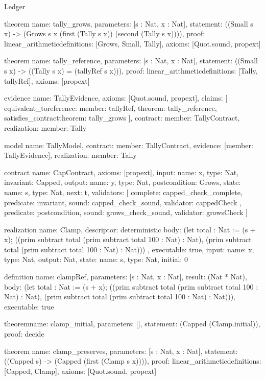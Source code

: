 \begin{lexlean}{Ledger}
\begin{semanticmodule}
theorem{
  name: tally_grows,
  parameters: [s : Nat, x : Nat],
  statement: ((Small s x) -> (Grows s x (first (Tally s x)) (second (Tally s x)))),
  proof: linear_arithmetic{definitions: [Grows, Small, Tally]},
  axioms: [Quot.sound, propext]
}

theorem{
  name: tally_reference,
  parameters: [s : Nat, x : Nat],
  statement: ((Small s x) -> ((Tally s x) = (tallyRef s x))),
  proof: linear_arithmetic{definitions: [Tally, tallyRef]},
  axioms: [propext]
}

evidence{
  name: TallyEvidence,
  axioms: [Quot.sound, propext],
  claims: [
    equivalent_to{reference: {member: tallyRef}, theorem: tally_reference},
    satisfies_contract{theorem: tally_grows}
  ],
  contract: {member: TallyContract},
  realization: {member: Tally}
}

model{
  name: TallyModel,
  contract: {member: TallyContract},
  evidence: [{member: TallyEvidence}],
  realization: {member: Tally}
}

contract{
  name: CapContract,
  axioms: [propext],
  input: {name: x, type: Nat},
  invariant: Capped,
  output: {name: y, type: Nat},
  postcondition: Grows,
  state: {name: s, type: Nat, next: t},
  validators: [
    {
      complete: capped_check_complete,
      predicate: invariant,
      sound: capped_check_sound,
      validator: cappedCheck
    },
    {predicate: postcondition, sound: grows_check_sound, validator: growsCheck}
  ]
}

realization{
  name: Clamp,
  descriptor: deterministic{
    body: (let total : Nat := (s + x); ((prim subtract total (prim subtract total 100 : Nat) : Nat), (prim subtract total (prim subtract total 100 : Nat) : Nat)))
  },
  executable: true,
  input: {name: x, type: Nat},
  output: Nat,
  state: {name: s, type: Nat, initial: 0}
}

definition{
  name: clampRef,
  parameters: [s : Nat, x : Nat],
  result: (Nat * Nat),
  body: (let total : Nat := (s + x); ((prim subtract total (prim subtract total 100 : Nat) : Nat), (prim subtract total (prim subtract total 100 : Nat) : Nat))),
  executable: true
}

theorem{name: clamp_initial, parameters: [], statement: (Capped (Clamp.initial)), proof: decide{}}

theorem{
  name: clamp_preserves,
  parameters: [s : Nat, x : Nat],
  statement: ((Capped s) -> (Capped (first (Clamp s x)))),
  proof: linear_arithmetic{definitions: [Capped, Clamp]},
  axioms: [Quot.sound, propext]
}


\end{semanticmodule}
\end{lexlean}
